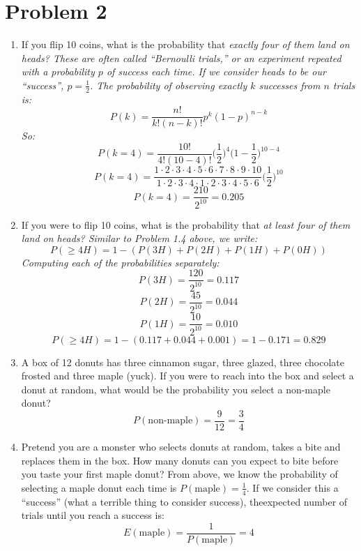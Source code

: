 \documentclass[11pt]{article}
\theoremstyle{definition}
\theoremstyle{remark}
\begin{document}
\section*{Problem 2}
\begin{enumerate}
\item If you flip 10 coins, what is the probability that \em exactly \em four of them land on heads?
{\color{red} 
These are often called ``Bernoulli trials,'' or an experiment repeated with a probability $p$ of success each time. If we consider heads to be our ``success'', $p=\frac{1}{2}$. The probability of observing exactly $k$ successes from $n$ trials is:
$$P(k) = \frac{n!}{k!(n-k)!}p^k(1-p)^{n-k}$$
So:
$$P(k=4) = \frac{10!}{4!(10-4)!}\bigg(\frac{1}{2}\bigg)^4\bigg(1-\frac{1}{2}\bigg)^{10-4}$$
$$P(k=4) = \frac{1\cdot 2 \cdot 3 \cdot 4 \cdot 5 \cdot 6 \cdot 7 \cdot 8 \cdot 9 \cdot 10}{1 \cdot 2 \cdot 3 \cdot 4 \cdot 1 \cdot 2 \cdot 3 \cdot 4 \cdot 5 \cdot 6}\bigg(\frac{1}{2}\bigg)^{10}$$
$$P(k=4) = \frac{210}{2^{10}} = 0.205 $$}

\item If you were to flip 10 coins, what is the probability that \em at least \em four of them land on heads?
{\color{red} Similar to Problem 1.4 above, we write:
$$ P(\geq 4H) = 1 - (P(3H) + P(2H) + P(1H) + P(0H)) $$
Computing each of the probabilities separately:
$$ P(3H) = \frac{120}{2^{10}} = 0.117 $$
$$ P(2H) = \frac{45}{2^{10}} = 0.044 $$
$$ P(1H) = \frac{10}{2^{10}} = 0.010 $$
$$ P(\geq 4H) = 1 - (0.117 + 0.044 + 0.001) = 1 - 0.171 = 0.829 $$}

\item A box of 12 donuts has three cinnamon sugar, three glazed, three chocolate frosted and three maple (yuck).  If you were to reach into the box and select a donut at random, what would be the probability you select a non-maple donut?
{\color{red} $$P(\text{non-maple}) = \frac{9}{12} = \frac{3}{4} $$}

\item Pretend you are a monster who selects donuts at random, takes a bite and replaces them in the box.  How many donuts can you expect to bite before you taste your first maple donut?
{\color{red} From above, we know the probability of selecting a maple donut each time is $P(\text{maple}) = \frac{1}{4}$. If we consider this a ``success'' (what a terrible thing to consider success), theexpected number of trials until you reach a success is:
$$ E(\text{maple}) = \frac{1}{P(\text{maple})} = 4 $$}

\end{enumerate}
\end{document}
